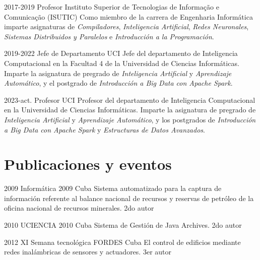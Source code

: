 \documentclass[letterpaper]{twentyonesecondcv} %
\begin{document}
{\begin{twenty}
    	\twentyitem
    	{2017-2019}
    	{Profesor}
    	{Instituto Superior de Tecnologias de Informação e Comunicação (ISUTIC)}
    	{Como miembro de la carrera de Engenharia Informática imparte asignaturas de \textit{Compiladores}, \textit{Inteligencia Artificial}, \textit{Redes Neuronales}, \textit{Sistemas Distribuidos y Paralelos} e \textit{Introducción a la Programación}.}
    	
    	\twentyitem
    	{2019-2022}
    	{Jefe de Departamento}
    	{UCI}
    	{Jefe del departamento de Inteligencia Computacional en la Facultad 4 de la Universidad de Ciencias Informáticas. Imparte la asignatura de pregrado de \textit{Inteligencia Artificial} y \textit{Aprendizaje Automático}, y el postgrado de \textit{Introducción a Big Data con Apache Spark}.}
    	
    	\twentyitem
    	{2023-act.}
    	{Profesor}
    	{UCI}
    	{Profesor del departamento de Inteligencia Computacional en la Universidad de Ciencias Informáticas. Imparte la asignatura de pregrado de \textit{Inteligencia Artificial} y \textit{Aprendizaje Automático}, y los postgrados de \textit{Introducción a Big Data con Apache Spark} y \textit{Estructuras de Datos Avanzados}.}
    	
    \end{twenty}
    
    \section{Publicaciones y eventos}
    
    \begin{twentymid} %
        
        \twentyitem
        {2009}
        {Informática 2009}
        {Cuba}
        {Sistema automatizado para la captura de información referente al balance nacional de recursos y reservas de petróleo de la oficina nacional de recursos minerales. 2do autor}
        
        \twentyitem
        {2010}
        {UCIENCIA 2010}
        {Cuba}
        {Sistema de Gestión de Java Archives. 2do autor}
        
        \twentyitem
        {2012}
        {XI Semana tecnológica FORDES}
        {Cuba}
        {El control de edificios mediante redes inalámbricas de sensores y actuadores. 3er autor}
       
    \end{twentymid}
    


}
\end{document}

